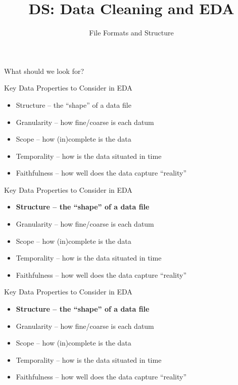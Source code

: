 \documentclass[aspectratio=169]{../latex_main/tntbeamer}  %
\title[Introduction]{DS: Data Cleaning and EDA}
\subtitle{File Formats and Structure}
\begin{document}
	
	\maketitle
	\begin{frame}{What should we look for?}
	    
	\end{frame}
	
	
	
	\begin{frame}{Key Data Properties to Consider in EDA}
	    \begin{itemize}
	        \item Structure -- the “shape” of a data file
	        \item Granularity -- how fine/coarse is each datum
	        \item Scope -- how (in)complete is the data
	        \item Temporality -- how is the data situated in time
	        \item Faithfulness -- how well does the data capture “reality”
	    \end{itemize}
	\end{frame}
	
	
	\begin{frame}{Key Data Properties to Consider in EDA}
	    \begin{itemize}
	        \item \textbf{Structure -- the “shape” of a data file}
	        \item Granularity -- how fine/coarse is each datum
	        \item Scope -- how (in)complete is the data
	        \item Temporality -- how is the data situated in time
	        \item Faithfulness -- how well does the data capture “reality”
	    \end{itemize}
	\end{frame}
	
	
	
	\begin{frame}{Key Data Properties to Consider in EDA}
	    \begin{itemize}
	        \item \textbf{Structure -- the “shape” of a data file}
	        \item Granularity -- how fine/coarse is each datum
	        \item Scope -- how (in)complete is the data
	        \item Temporality -- how is the data situated in time
	        \item Faithfulness -- how well does the data capture “reality”
	    \end{itemize}
	\end{frame}
	
\end{document}
